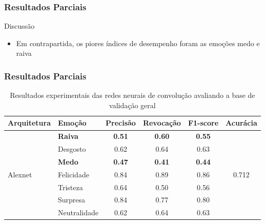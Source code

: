\documentclass{beamer}
\begin{document}
\begin{frame}
\frametitle{Resultados Parciais}
 \begin{block}{Discussão}
\begin{itemize}
\pause
\item Em contrapartida, os piores índices de desempenho foram as emoções medo e raiva

\end{itemize}
\end{block}
\end{frame}



\begin{frame}
 \frametitle{Resultados Parciais}
\begin{table}[]
\tiny
\centering
\caption{Resultados experimentais das redes neurais de convolução avaliando a base de validação geral}
\label{table:resultsexp}
\begin{tabular}{llcccc}
\hline
\textbf{Arquitetura}                & \textbf{Emoção}       & \textbf{Precisão} & \textbf{Revocação} & \textbf{F1-score} & \textbf{Acurácia}               \\ \hline
\multirow{8}{*}{Alexnet}            & \scriptsize \textbf{Raiva}                 & \scriptsize \textbf{0.51}              & \scriptsize \textbf{0.60}               & \scriptsize \textbf{0.55}              & \multirow{8}{*}{0.712}          \\
                                    & Desgosto              & 0.62              & 0.64               & 0.63              &                                 \\
                                    & \scriptsize \textbf{Medo}                  & \scriptsize \textbf{0.47}              & \scriptsize \textbf{0.41}               & \scriptsize \textbf{0.44}              &                                 \\
                                    & Felicidade            & 0.84              & 0.89               & 0.86              &                                 \\
                                    & Tristeza              & 0.64              & 0.50               & 0.56              &                                 \\
                                    & Surpresa              & 0.84              & 0.77               & 0.80              &                                 \\
                                    & Neutralidade          & 0.62              & 0.64               & 0.63              &                                 \\

\end{tabular}
\end{table}
\end{frame}
\end{document}
